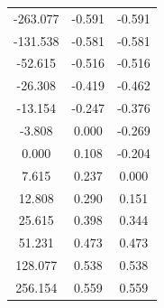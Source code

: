 \documentclass[UTF8]{article}
\theoremstyle{MyLineTheoremStyle} %
\theoremstyle{MyBlockTheoremStyle} %
\theoremstyle{MySubsubsectionStyle} %
\begin{document}
\begin{center}
\begin{minipage}{0.35\columnwidth}
\begin{table}[H]
\begin{tabular}{ccc}
\midrule
-263.077 &-0.591 &-0.591 \\
-131.538 &-0.581 &-0.581 \\
-52.615	 &-0.516 &-0.516 \\
-26.308	 &-0.419 &-0.462 \\
-13.154	 &-0.247 &-0.376 \\
-3.808	 &0.000	 &-0.269 \\
0.000	 &0.108	 &-0.204 \\
7.615	 &0.237	 &0.000  \\
12.808	 &0.290	 &0.151  \\
25.615	 &0.398	 &0.344  \\
51.231	 &0.473	 &0.473  \\
128.077	 &0.538	 &0.538  \\
256.154	 &0.559	 &0.559  \\
\bottomrule
    \end{tabular}
\end{table}
\end{minipage}
\begin{minipage}{0.24\columnwidth}
\begin{figure}[H]\centering

\end{figure}
\end{minipage}
\end{center}
\end{document}

